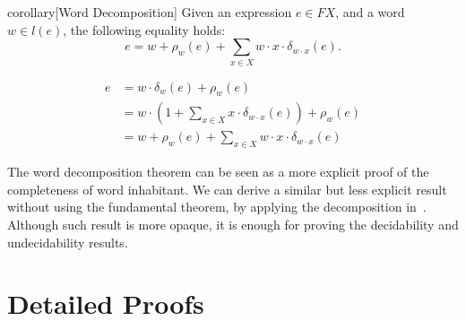 \documentclass[a4paper,UKenglish,cleveref, autoref, thm-restate]{lipics-v2021}
\begin{document}
\begin{theoremEnd}{corollary}[Word Decomposition]
  Given an expression \(e  \in  F X\), and a word \(w  \in  l(e)\),
  the following equality holds:
  \[e = w +  \rho _w(e) +
         \sum _{x  \in  X} w  \cdot  x  \cdot   \delta _{w  \cdot  x}(e).\]
\end{theoremEnd}

\begin{proofEnd}
  \begin{align*}
    e
    & = w  \cdot   \delta _w(e) +  \rho _w(e) \\
    & = w  \cdot  (1 +  \sum _{x  \in  X} x  \cdot   \delta _{w \cdot x}(e)) +  \rho _w(e) \\
    & = w +  \rho _w(e) +  \sum _{x  \in  X} w  \cdot  x  \cdot   \delta _{w  \cdot  x}(e)
  \end{align*}
\end{proofEnd}

The word decomposition theorem can be seen as a more explicit proof of
the completeness of word inhabitant.
We can derive a similar but less explicit result without using the fundamental theorem,
by applying the decomposition in~.
Although such result is more opaque, it is enough for proving the decidability and undecidability results.


\fi %

\iffull \else
\appendix
\section{Detailed Proofs}
\printProofs
\fi
\end{document}
